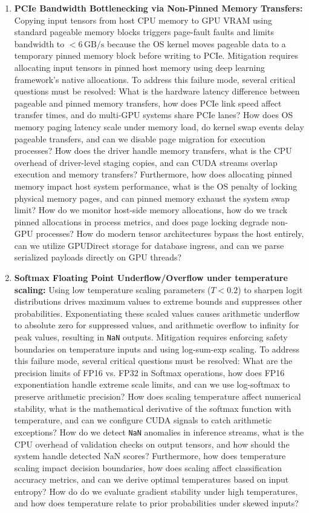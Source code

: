 \documentclass[11pt,a4paper]{article}
\theoremstyle{plain}
\theoremstyle{definition}
\theoremstyle{remark}
\begin{document}
\begin{enumerate}[label=\textbf{DF\arabic*.}]
    \item \textbf{PCIe Bandwidth Bottlenecking via Non-Pinned Memory Transfers:} 
    Copying input tensors from host CPU memory to GPU VRAM using standard pageable memory blocks triggers page-fault faults and limits bandwidth to $<6\,\mathrm{GB/s}$ because the OS kernel moves pageable data to a temporary pinned memory block before writing to PCIe.
    Mitigation requires allocating input tensors in pinned host memory using deep learning framework's native allocations.
    To address this failure mode, several critical questions must be resolved: What is the hardware latency difference between pageable and pinned memory transfers, how does PCIe link speed affect transfer times, and do multi-GPU systems share PCIe lanes? How does OS memory paging latency scale under memory load, do kernel swap events delay pageable transfers, and can we disable page migration for execution processes? How does the driver handle memory transfers, what is the CPU overhead of driver-level staging copies, and can CUDA streams overlap execution and memory transfers? Furthermore, how does allocating pinned memory impact host system performance, what is the OS penalty of locking physical memory pages, and can pinned memory exhaust the system swap limit? How do we monitor host-side memory allocations, how do we track pinned allocations in process metrics, and does page locking degrade non-GPU processes? How do modern tensor architectures bypass the host entirely, can we utilize GPUDirect storage for database ingress, and can we parse serialized payloads directly on GPU threads?

    \item \textbf{Softmax Floating Point Underflow/Overflow under temperature scaling:} 
    Using low temperature scaling parameters ($T < 0.2$) to sharpen logit distributions drives maximum values to extreme bounds and suppresses other probabilities. Exponentiating these scaled values causes arithmetic underflow to absolute zero for suppressed values, and arithmetic overflow to infinity for peak values, resulting in \texttt{NaN} outputs. 
    Mitigation requires enforcing safety boundaries on temperature inputs and using log-sum-exp scaling.
    To address this failure mode, several critical questions must be resolved: What are the precision limits of FP16 vs. FP32 in Softmax operations, how does FP16 exponentiation handle extreme scale limits, and can we use log-softmax to preserve arithmetic precision? How does scaling temperature affect numerical stability, what is the mathematical derivative of the softmax function with temperature, and can we configure CUDA signals to catch arithmetic exceptions? How do we detect \texttt{NaN} anomalies in inference streams, what is the CPU overhead of validation checks on output tensors, and how should the system handle detected NaN scores? Furthermore, how does temperature scaling impact decision boundaries, how does scaling affect classification accuracy metrics, and can we derive optimal temperatures based on input entropy? How do do we evaluate gradient stability under high temperatures, and how does temperature relate to prior probabilities under skewed inputs?


\end{enumerate}
\end{document}

